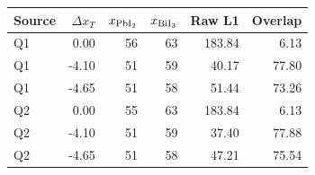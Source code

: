 \begin{tabular}{lrrrrr}
\toprule
Source & $\Delta x_T$ & $x_{\rm PbI_2}$ & $x_{\rm BiI_3}$ & Raw L1 & Overlap \\
\midrule
Q1 & 0.00 & 56 & 63 & 183.84 & 6.13 \\
Q1 & -4.10 & 51 & 59 & 40.17 & 77.80 \\
Q1 & -4.65 & 51 & 58 & 51.44 & 73.26 \\
Q2 & 0.00 & 55 & 63 & 183.84 & 6.13 \\
Q2 & -4.10 & 51 & 59 & 37.40 & 77.88 \\
Q2 & -4.65 & 51 & 58 & 47.21 & 75.54 \\
\bottomrule
\end{tabular}
